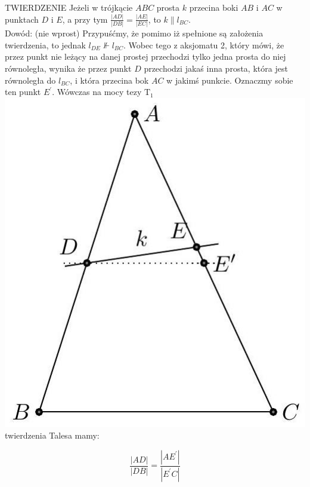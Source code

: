 \documentclass[10pt]{article}
\begin{document}
TWIERDZENIE Jeżeli w trójkącie \(A B C\) prosta \(k\) przecina boki \(A B\) i \(A C\) w punktach \(D\) i \(E\), a przy tym \(\frac{|A D|}{|D B|}=\frac{|A E|}{|E C|}\), to \(k \| l_{B C}\).\\
Dowód: (nie wprost) Przypuśćmy, że pomimo iż spełnione są założenia twierdzenia, to jednak \(l_{D E} \nVdash l_{B C}\). Wobec tego z aksjomatu 2, który mówi, że przez punkt nie leżący na danej prostej przechodzi tylko jedna prosta do niej równoległa, wynika że przez punkt \(D\) przechodzi jakaś inna prosta, która jest równoległa do \(l_{B C}\), i która przecina bok \(A C\) w jakimś punkcie. Oznaczmy sobie ten punkt \(E^{\prime}\). Wówczas na mocy tezy \(\mathrm{T}_{1}\)\\
\includegraphics[max width=\textwidth, center]{2024_11_21_e9b4faa005d5be2cc318g-012}\\
twierdzenia Talesa mamy:

\[
\frac{|A D|}{|D B|}=\frac{\left|A E^{\prime}\right|}{\left|E^{\prime} C\right|}
\]
\end{document}
